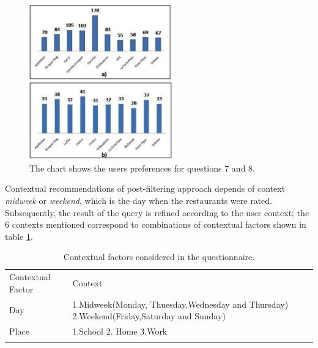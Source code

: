 \begin{figure}
\captionsetup{justification=centering,margin=2cm,font=footnotesize}
\centering
\setlength\fboxsep{0pt}
\includegraphics[width=0.55\textwidth]{img/bars.png}
\caption{The chart shows the users preferences for questions 7 and 8.}
\label{fig:barschart}     
\end{figure}
Contextual recommendations of post-filtering approach depends of
context \textit{midweek} or \textit{weekend}, which is the day when
the restaurants were rated. Subsequently, the result of the query is
refined according to the user context; the 6 contexts mentioned
correspond to combinations of contextual factors shown in table
\ref{tab:contextstijuana}.
\begin{table}
\small
\captionsetup{font=footnotesize}
\caption{Contextual factors considered in the questionnaire.}
\label{tab:contextstijuana} 
\centering
\begin{tabular}{p{2.5cm} p{7cm} }
\hline\noalign{\smallskip}
Contextual Factor & Context \\
\noalign{\smallskip}\hline\noalign{\smallskip}
\small{Day} & \small{1.Midweek(Monday, Thuesday,Wednesday and Thursday)
2.Weekend(Friday,Saturday and Sunday)}  \\ \hline 
\small{Place} & \small{1.School 2. Home 3.Work} \\ 
\noalign{\smallskip}\hline
\end{tabular}
\end{table}



